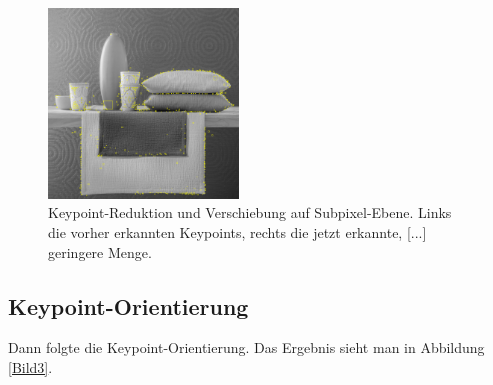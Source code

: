 \documentclass[a4paper,12pt]{scrartcl}
\begin{document}
\begin{figure}[htbp]
  \centering
  \includegraphics[width=0.45\textwidth]{4RechteckemHkorrigiert} 
  \caption{Keypoint-Reduktion und Verschiebung auf Subpixel-Ebene. Links die vorher erkannten
  Keypoints, rechts die jetzt erkannte, [...] geringere Menge.}
  \label{Bild2}
\end{figure}

\subsection{Keypoint-Orientierung}
Dann folgte die Keypoint-Orientierung. Das Ergebnis sieht man in Abbildung \ref{Bild3}.
\end{document}
